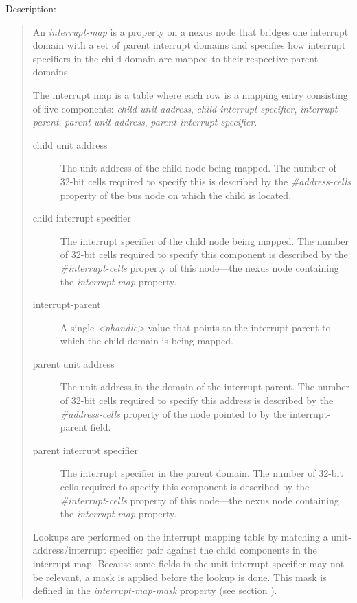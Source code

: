 \documentclass[a4paper,10pt,oneside]{sphinxmanual}
\begin{document}
Description:
\begin{quote}

An \emph{interrupt-map} is a property on a nexus node that bridges one
interrupt domain with a set of parent interrupt domains and specifies
how interrupt specifiers in the child domain are mapped to their
respective parent domains.

The interrupt map is a table where each row is a mapping entry
consisting of five components: \emph{child unit address}, \emph{child interrupt
specifier}, \emph{interrupt-parent}, \emph{parent unit address}, \emph{parent interrupt
specifier}.
\begin{description}
\item[{child unit address}] \leavevmode
The unit address of the child node being mapped. The number of
32-bit cells required to specify this is described by the
\emph{\#address-cells} property of the bus node on which the child is
located.

\item[{child interrupt specifier}] \leavevmode
The interrupt specifier of the child node being mapped. The number
of 32-bit cells required to specify this component is described by
the \emph{\#interrupt-cells} property of this node—the nexus node
containing the \emph{interrupt-map} property.

\item[{interrupt-parent}] \leavevmode
A single \emph{\textless{}phandle\textgreater{}} value that points to the interrupt parent to
which the child domain is being mapped.

\item[{parent unit address}] \leavevmode
The unit address in the domain of the interrupt parent. The number
of 32-bit cells required to specify this address is described by the
\emph{\#address-cells} property of the node pointed to by the
interrupt-parent field.

\item[{parent interrupt specifier}] \leavevmode
The interrupt specifier in the parent domain. The number of 32-bit
cells required to specify this component is described by the
\emph{\#interrupt-cells} property of this node—the nexus node containing
the \emph{interrupt-map} property.

\end{description}

Lookups are performed on the interrupt mapping table by matching a
unit-address/interrupt specifier pair against the child components in
the interrupt-map. Because some fields in the unit interrupt specifier
may not be relevant, a mask is applied before the lookup is done. This
mask is defined in the \emph{interrupt-map-mask} property (see section
{\hyperref[devicetree\string-basics:sect\string-interrupt\string-map\string-mask]{}}).


\end{quote}
\end{document}
